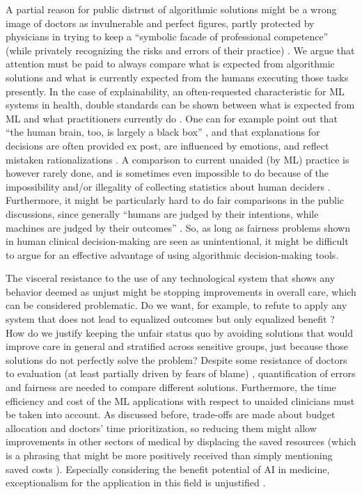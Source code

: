     A partial reason for public distrust of algorithmic solutions might be a wrong image of doctors as invulnerable and perfect figures, partly protected by physicians in trying to keep a ``symbolic facade of professional competence'' (while privately recognizing the risks and errors of their practice) \cite{Waring2005}.
    We argue that attention must be paid to always compare what is expected from algorithmic solutions and what is currently expected from the humans executing those tasks presently.
    In the case of explainability, an often-requested characteristic for ML systems in health, double standards can be shown between what is expected from ML and what practitioners currently do \cite{Zerilli2019}.
    One can for example point out that ``the human brain, too, is largely a black box'' \cite[p.~666]{Zerilli2019}, and that explanations for decisions are often provided ex post, are influenced by emotions, and reflect mistaken rationalizations \cite{Zerilli2019}.
    A comparison to current unaided (by ML) practice is however rarely done, and is sometimes even impossible to do because of the impossibility and/or illegality of collecting statistics about human deciders \cite{Williamson2021}.
    Furthermore, it might be particularly hard to do fair comparisons in the public discussions, since generally ``humans are judged by their intentions, while machines are judged by their outcomes'' \cite[p.~139]{Hidalgo2021}.
    So, as long as fairness problems shown in human clinical decision-making are seen as unintentional, it might be difficult to argue for an effective advantage of using algorithmic decision-making tools.

    The visceral resistance to the use of any technological system that shows any behavior deemed as unjust might be stopping improvements in overall care, which can be considered problematic.
    Do we want, for example, to refute to apply any system that does not lead to equalized outcomes but only equalized benefit \cite{Rajkomar2018}?
    How do we justify keeping the unfair status quo by avoiding solutions that would improve care in general and stratified across sensitive groups, just because those solutions do not perfectly solve the problem?
    Despite some resistance of doctors to evaluation (at least partially driven by fears of blame) \cite{Waring2005}, quantification of errors and fairness are needed to compare different solutions.
    Furthermore, the time efficiency and cost of the ML applications with respect to unaided clinicians must be taken into account.
    As discussed before, trade-offs are made about budget allocation and doctors' time prioritization, so reducing them might allow improvements in other sectors of medical by displacing the saved resources (which is a phrasing that might be more positively received than simply mentioning saved costs \cite{Tetlock2003}).
    Especially considering the benefit potential of AI in medicine, exceptionalism for the application in this field is unjustified \cite{Fletcher2021}.

